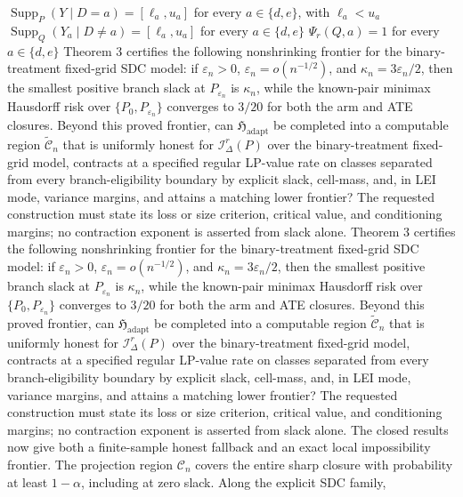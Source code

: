 \(\operatorname{Supp}_P(Y\mid D=a)=[\ell_a,u_a]\) for every \(a\in\{d,e\}\), with \(\ell_a<u_a\)
\(\operatorname{Supp}_Q(Y_a\mid D\ne a)=[\ell_a,u_a]\) for every \(a\in\{d,e\}\)
\(\Psi_r(Q,a)=1\) for every \(a\in\{d,e\}\)
Theorem 3 certifies the following nonshrinking frontier for the binary-treatment fixed-grid SDC model: if \(\varepsilon_n>0\), \(\varepsilon_n=o(n^{-1/2})\), and \(\kappa_n=3\varepsilon_n/2\), then the smallest positive branch slack at \(P_{\varepsilon_n}\) is \(\kappa_n\), while the known-pair minimax Hausdorff risk over \(\{P_0,P_{\varepsilon_n}\}\) converges to \(3/20\) for both the arm and ATE closures.  Beyond this proved frontier, can \(\mathfrak H_{\mathrm{adapt}}\) be completed into a computable region \(\widetilde{\mathcal C}_n\) that is uniformly honest for \(\mathcal I_\Delta^r(P)\) over the binary-treatment fixed-grid model, contracts at a specified regular LP-value rate on classes separated from every branch-eligibility boundary by explicit slack, cell-mass, and, in LEI mode, variance margins, and attains a matching lower frontier?  The requested construction must state its loss or size criterion, critical value, and conditioning margins; no contraction exponent is asserted from slack alone.
Theorem 3 certifies the following nonshrinking frontier for the binary-treatment fixed-grid SDC model: if \(\varepsilon_n>0\), \(\varepsilon_n=o(n^{-1/2})\), and \(\kappa_n=3\varepsilon_n/2\), then the smallest positive branch slack at \(P_{\varepsilon_n}\) is \(\kappa_n\), while the known-pair minimax Hausdorff risk over \(\{P_0,P_{\varepsilon_n}\}\) converges to \(3/20\) for both the arm and ATE closures.  Beyond this proved frontier, can \(\mathfrak H_{\mathrm{adapt}}\) be completed into a computable region \(\widetilde{\mathcal C}_n\) that is uniformly honest for \(\mathcal I_\Delta^r(P)\) over the binary-treatment fixed-grid model, contracts at a specified regular LP-value rate on classes separated from every branch-eligibility boundary by explicit slack, cell-mass, and, in LEI mode, variance margins, and attains a matching lower frontier?  The requested construction must state its loss or size criterion, critical value, and conditioning margins; no contraction exponent is asserted from slack alone.
The closed results now give both a finite-sample honest fallback and an exact local impossibility frontier.  The projection region \(\mathcal C_n\) covers the entire sharp closure with probability at least \(1-\alpha\), including at zero slack.  Along the explicit SDC family,
